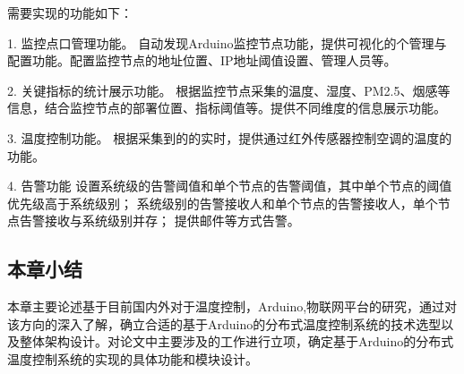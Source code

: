 需要实现的功能如下：

1. 监控点口管理功能。 自动发现Arduino监控节点功能，提供可视化的个管理与配置功能。配置监控节点的地址位置、IP地址阈值设置、管理人员等。

2. 关键指标的统计展示功能。 根据监控节点采集的温度、湿度、PM2.5、烟感等信息，结合监控节点的部署位置、指标阈值等。提供不同维度的信息展示功能。 

3. 温度控制功能。 根据采集到的的实时，提供通过红外传感器控制空调的温度的功能。 

4. 告警功能 设置系统级的告警阈值和单个节点的告警阈值，其中单个节点的阈值优先级高于系统级别； 系统级别的告警接收人和单个节点的告警接收人，单个节点告警接收与系统级别并存； 提供邮件等方式告警。

\subsection{本章小结}
本章主要论述基于目前国内外对于温度控制，Arduino,物联网平台的研究，通过对该方向的深入了解，确立合适的基于Arduino的分布式温度控制系统的技术选型以及整体架构设计。对论文中主要涉及的工作进行立项，确定基于Arduino的分布式温度控制系统的实现的具体功能和模块设计。